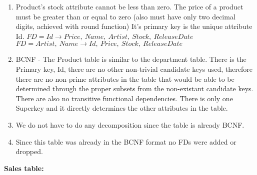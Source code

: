 \documentclass{article}
\begin{document}
  \begin{enumerate}[label=\roman*]
  	\item Product's stock attribute cannot be less than zero. The price of a product must be greater than or equal to zero (also must have only two decimal digits, achieved with round function) It's primary key is the unique attribute Id. \newline
    $FD = Id \rightarrow Price,\ Name,\ Artist,\ Stock,\ ReleaseDate$\newline
    $FD = Artist,\ Name \rightarrow Id,\ Price,\ Stock,\ ReleaseDate$
  	\item BCNF - The Product table is similar to the department table. There is the Primary key, Id, there are no other non-trivial candidate keys used, therefore there are no non-prime attributes in the table that would be able to be determined through the proper subsets from the non-existant candidate keys. There are also no transitive functional dependencies. There is only one Superkey and it directly determines the other attributes in the table.
  	\item We do not have to do any decomposition since the table is already BCNF.
  	\item Since this table was already in the BCNF format no FDs were added or dropped.
  \end{enumerate}
  \par\textbf{Sales table:}
\end{document}
